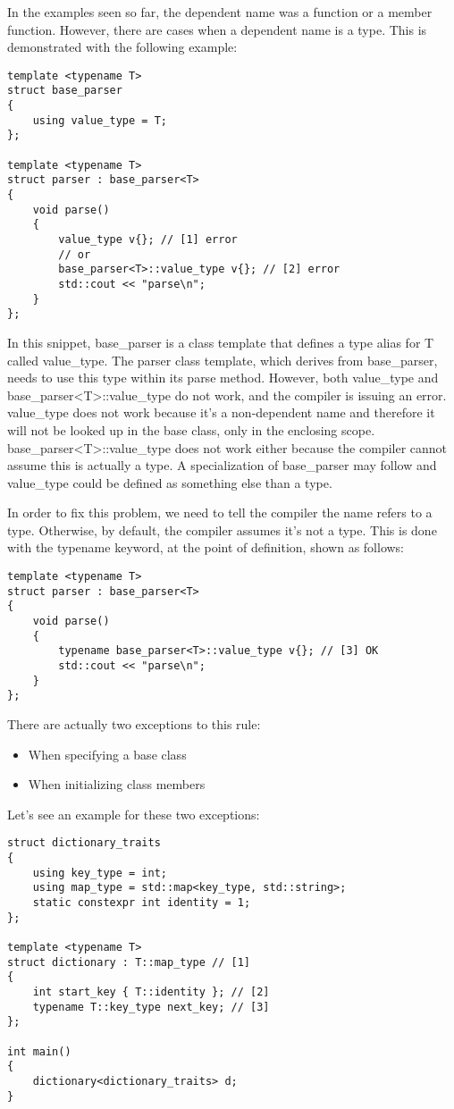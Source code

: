 In the examples seen so far, the dependent name was a function or a member function. However, there are cases when a dependent name is a type. This is demonstrated with the following example:

\begin{lstlisting}[style=styleCXX]
template <typename T>
struct base_parser
{
	using value_type = T;
};

template <typename T>
struct parser : base_parser<T>
{
	void parse()
	{
		value_type v{}; // [1] error
		// or
		base_parser<T>::value_type v{}; // [2] error
		std::cout << "parse\n";
	}
};
\end{lstlisting}

In this snippet, base\_parser is a class template that defines a type alias for T called value\_type. The parser class template, which derives from base\_parser, needs to use this type within its parse method. However, both value\_type and base\_parser<T>::value\_type do not work, and the compiler is issuing an error. value\_type does not work because it’s a non-dependent name and therefore it will not be looked up in the base class, only in the enclosing scope. base\_parser<T>::value\_type does not work either because the compiler cannot assume this is actually a type. A specialization of base\_parser may follow and value\_type could be defined as something else than a type.

In order to fix this problem, we need to tell the compiler the name refers to a type. Otherwise, by default, the compiler assumes it’s not a type. This is done with the typename keyword, at the point of definition, shown as follows:

\begin{lstlisting}[style=styleCXX]
template <typename T>
struct parser : base_parser<T>
{
	void parse()
	{
		typename base_parser<T>::value_type v{}; // [3] OK
		std::cout << "parse\n";
	}
};
\end{lstlisting}

There are actually two exceptions to this rule:

\begin{itemize}
\item
When specifying a base class

\item
When initializing class members
\end{itemize}

Let’s see an example for these two exceptions:

\begin{lstlisting}[style=styleCXX]
struct dictionary_traits
{
	using key_type = int;
	using map_type = std::map<key_type, std::string>;
	static constexpr int identity = 1;
};

template <typename T>
struct dictionary : T::map_type // [1]
{
	int start_key { T::identity }; // [2]
	typename T::key_type next_key; // [3]
};

int main()
{
	dictionary<dictionary_traits> d;
}
\end{lstlisting}

